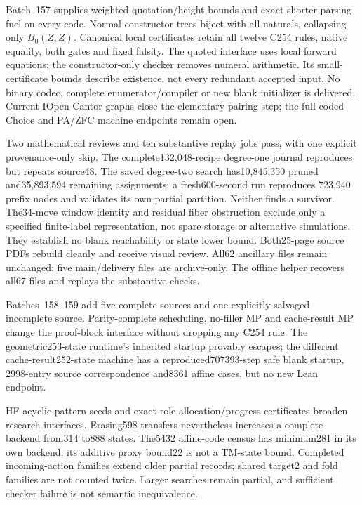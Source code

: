 \documentclass[11pt]{article}
\begin{document}
{Batch~157 supplies weighted quotation/height bounds and exact shorter parsing
fuel on every code. Normal constructor trees biject with all naturals, collapsing
only $B_0(Z,Z)$. Canonical local certificates retain all twelve C254 rules,
native equality, both gates and fixed falsity. The quoted interface uses local
forward equations; the constructor-only checker removes numeral arithmetic.
Its small-certificate bounds describe existence, not every redundant accepted
input. No binary codec, complete enumerator/compiler or new blank initializer
is delivered. Current IOpen Cantor graphs close the elementary pairing step;
the full coded Choice and PA/ZFC machine endpoints remain open.

Two mathematical reviews and ten substantive replay jobs pass, with one
explicit provenance-only skip. The complete132,048-recipe degree-one journal
reproduces but repeats source48. The saved degree-two search has10,845,350
pruned and35,893,594 remaining assignments; a fresh600-second run reproduces
723,940 prefix nodes and validates its own partial partition. Neither finds a
survivor. The34-move window identity and residual fiber obstruction exclude
only a specified finite-label representation, not spare storage or alternative
simulations. They establish no blank reachability or state lower bound.
Both25-page source PDFs rebuild cleanly and receive visual review. All62
ancillary files remain unchanged; five main/delivery files are archive-only.
The offline helper recovers all67 files and replays the substantive checks.

Batches~158--159 add five complete sources and one explicitly salvaged
incomplete source. Parity-complete scheduling, no-filler MP and cache-result
MP change the proof-block interface without dropping any C254 rule. The
geometric253-state runtime's inherited startup provably escapes; the different
cache-result252-state machine has a reproduced707393-step safe blank startup,
2998-entry source correspondence and8361 affine cases, but no new Lean endpoint.

HF acyclic-pattern seeds and exact role-allocation/progress certificates broaden
research interfaces. Erasing598 transfers nevertheless increases a complete
backend from314 to888 states. The5432 affine-code census has minimum281 in its
own backend; its additive proxy bound22 is not a TM-state bound. Completed
incoming-action families extend older partial records; shared target2 and fold
families are not counted twice. Larger searches remain partial, and sufficient
checker failure is not semantic inequivalence.

}
\end{document}
